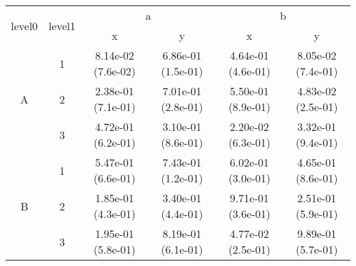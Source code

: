 \begin{tabular}{cccccc}
\toprule
\multirow{2}{*}{level0} & \multirow{2}{*}{level1}
&\multicolumn{2}{c}{a}&\multicolumn{2}{c}{b}\tabularnewline
\cmidrule(lr){3-4}
\cmidrule(lr){5-6}
&&x&y&x&y\tabularnewline
\midrule
\multirow{3}{*}{A}&1& 8.14e-02 (7.6e-02)& 6.86e-01 (1.5e-01)& 4.64e-01 (4.6e-01)& 8.05e-02 (7.4e-01)\tabularnewline
&2& 2.38e-01 (7.1e-01)& 7.01e-01 (2.8e-01)& 5.50e-01 (8.9e-01)& 4.83e-02 (2.5e-01)\tabularnewline
&3& 4.72e-01 (6.2e-01)& 3.10e-01 (8.6e-01)& 2.20e-02 (6.3e-01)& 3.32e-01 (9.4e-01)\tabularnewline
\midrule
\multirow{3}{*}{B}&1& 5.47e-01 (6.6e-01)& 7.43e-01 (1.2e-01)& 6.02e-01 (3.0e-01)& 4.65e-01 (8.6e-01)\tabularnewline
&2& 1.85e-01 (4.3e-01)& 3.40e-01 (4.4e-01)& 9.71e-01 (3.6e-01)& 2.51e-01 (5.9e-01)\tabularnewline
&3& 1.95e-01 (5.8e-01)& 8.19e-01 (6.1e-01)& 4.77e-02 (2.5e-01)& 9.89e-01 (5.7e-01)\tabularnewline
\bottomrule
\end{tabular}
